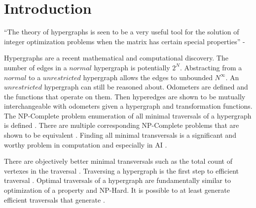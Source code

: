 \chapter{Introduction}

``The theory of hypergraphs is seen to be a very useful tool for the solution of integer optimization problems when the matrix has certain special properties'' - \cite{berge1984hypergraphs}

Hypergraphs are a recent mathematical and computational discovery. The number of edges in a $normal$ hypergraph is potentially $2^N$. Abstracting from a $normal$ to a $unrestricted$ hypergraph allows the edges to unbounded $N^\infty$. An $unrestricted$ hypergraph can still be reasoned about. Odometers \cite{Odometer:Fuchs} are defined and the functions that operate on them. Then hyperedges are shown to be mutually interchangeable with odometers given a hypergraph and transformation functions. \\

The NP-Complete problem enumeration of all minimal traversals of a hypergraph is  defined \cite{eiter1991transveral}. There are multiple corresponding NP-Complete problems that are shown to be equivalent \cite{eiter1995identifying}. Finding all minimal transversals is a significant and worthy problem in computation and especially in AI \cite{eiter2002hypergraph}. 

There are objectively better minimal transversals such as the total count of vertexes in the traversal \cite{bailey2003fast}. Traversing a hypergraph is the first step to efficient traversal \cite{boros2003efficient}. Optimal traversals of a hypergraph are fundamentally similar to optimization of a property and NP-Hard. It is possible to at least generate efficient traversals that generate . \\ 